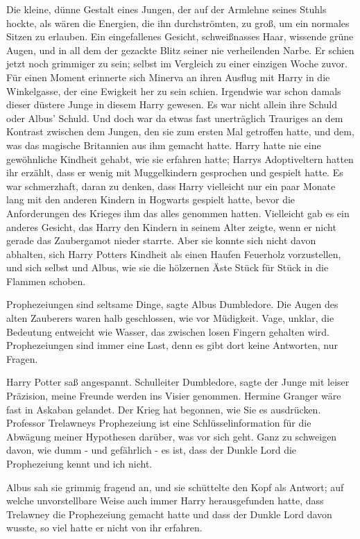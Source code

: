 Die kleine, dünne Gestalt eines Jungen, der auf der Armlehne seines Stuhls
hockte, als wären die Energien, die ihn durchströmten, zu groß, um ein normales
Sitzen zu erlauben. Ein eingefallenes Gesicht, schweißnasses Haar, wissende
grüne Augen, und in all dem der gezackte Blitz seiner nie verheilenden Narbe. Er
schien jetzt noch grimmiger zu sein; selbst im Vergleich zu einer einzigen Woche
zuvor. Für einen Moment erinnerte sich Minerva an ihren Ausflug mit Harry in die
Winkelgasse, der eine Ewigkeit her zu sein schien. Irgendwie war schon damals
dieser düstere Junge in diesem Harry gewesen. Es war nicht allein ihre Schuld
oder Albus' Schuld. Und doch war da etwas fast unerträglich Trauriges an dem
Kontrast zwischen dem Jungen, den sie zum ersten Mal getroffen hatte, und dem,
was das magische Britannien aus ihm gemacht hatte. Harry hatte nie eine
gewöhnliche Kindheit gehabt, wie sie erfahren hatte; Harrys Adoptiveltern hatten
ihr erzählt, dass er wenig mit Muggelkindern gesprochen und gespielt hatte. Es
war schmerzhaft, daran zu denken, dass Harry vielleicht nur ein paar Monate lang
mit den anderen Kindern in Hogwarts gespielt hatte, bevor die Anforderungen des
Krieges ihm das alles genommen hatten. Vielleicht gab es ein anderes Gesicht,
das Harry den Kindern in seinem Alter zeigte, wenn er nicht gerade das
Zaubergamot nieder starrte. Aber sie konnte sich nicht davon abhalten, sich
Harry Potters Kindheit als einen Haufen Feuerholz vorzustellen, und sich selbst
und Albus, wie sie die hölzernen Äste Stück für Stück in die Flammen schoben.

\glqq{}Prophezeiungen sind seltsame Dinge\grqq{}, sagte Albus Dumbledore. Die
Augen des alten Zauberers waren halb geschlossen, wie vor Müdigkeit. \glqq{}Vage,
unklar, die Bedeutung entweicht wie Wasser, das zwischen losen Fingern gehalten
wird. Prophezeiungen sind immer eine Last, denn es gibt dort keine Antworten,
nur Fragen.\grqq{}

Harry Potter saß angespannt. \glqq{}Schulleiter Dumbledore\grqq{}, sagte der
Junge mit leiser Präzision, \glqq{}meine Freunde werden ins Visier genommen.
Hermine Granger wäre fast in Askaban gelandet. Der Krieg hat begonnen, wie Sie
es ausdrücken. Professor Trelawneys Prophezeiung ist eine Schlüsselinformation
für die Abwägung meiner Hypothesen darüber, was vor sich geht. Ganz zu schweigen
davon, wie dumm - und gefährlich - es ist, dass der Dunkle Lord die Prophezeiung
kennt und ich nicht.\grqq{}

Albus sah sie grimmig fragend an, und sie schüttelte den Kopf als Antwort; auf
welche unvorstellbare Weise auch immer Harry herausgefunden hatte, dass
Trelawney die Prophezeiung gemacht hatte und dass der Dunkle Lord davon wusste,
so viel hatte er nicht von ihr erfahren.

